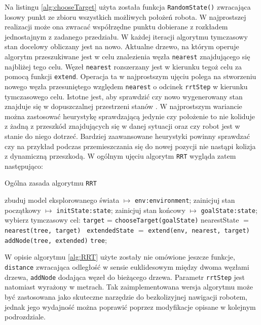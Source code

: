 Na listingu \ref{alg:chooseTarget} użyta została funkcja \texttt{RandomState()} zwracająca losowy punkt ze zbioru wszystkich możliwych położeń robota.
W najprostszej realizacji może ona zwracać współrzędne punktu dobierane z rozkładem jednostajnym z zadanego przedziału.
W każdej iteracji algorytmu tymczasowy stan docelowy obliczany jest na nowo. Aktualne drzewo, na którym operuje algorytm przeszukiwane jest w celu znalezienia
węzła \texttt{nearest} znajdującego się najbliżej tego celu. Węzeł \texttt{nearest} rozszerzany jest w kierunku tegoż celu za pomocą funkcji \texttt{extend}.
Operacja ta w najprostszym ujęciu polega na stworzeniu nowego węzła przesuniętego względem \texttt{nearest} o odcinek \texttt{rrtStep} w kierunku tymczasowego celu.
Istotne jest, aby sprawdzić czy nowo wygenerowany stan znajduje się w dopuszczalnej przestrzeni stanów \textdollar. W najprostszym wariancie można zastosować
heurystykę sprawdzającą jedynie czy położenie to nie koliduje z żadną z przeszkód znajdujących się w danej sytuacji oraz czy robot jest w stanie do niego dotrzeć.
Bardziej zaawansowane heurystyki powinny sprawdzać czy na przykład podczas przemieszczania  się do nowej pozycji nie nastąpi kolizja z dynamiczną przeszkodą.
W ogólnym ujęciu algorytm \texttt{RRT} wygląda zatem następująco:
  \begin{algorithm}[H]
	\caption{ Ogólna zasada algorytmu \texttt{RRT} }
	\label{alg:RRT}
	\begin{algorithmic}
	\STATE zbuduj model eksplorowanego świata $\mapsto$ \texttt{env:environment};
	\STATE zainicjuj stan początkowy $\mapsto$ \texttt{initState:state};
	\STATE zainicjuj stan końcowy $\mapsto$ \texttt{goalState:state};
	\STATE
	  \STATE wybierz tymczasowy cel: \texttt{target} =  \texttt{chooseTarget(goalState)}
	  \STATE nearestState $=$ \texttt{ nearest(tree, target) }
	  \STATE \texttt{extendedState} $=$ \texttt{extend(env, nearest, target)}
	    \STATE \texttt{addNode(tree, extended)}
	  \ENDIF
	\ENDWHILE
	\RETURN  \texttt{tree};
	\end{algorithmic}
  \end{algorithm}
W opisie algorytmu \ref{alg:RRT} użyte zostały nie omówione jeszcze funkcje, \texttt{distance} zwracająca odległość w sensie euklidesowym między dwoma węzłami drzewa,
\texttt{addNode} dodająca węzeł do bieżącego drzewa. Parametr \texttt{rrtStep} jest natomiast wyrażony w metrach.
Tak zaimplementowana wersja algorytmu może być zastosowana jako skuteczne narzędzie do bezkolizyjnej nawigacji robotem, jednak jego wydajność można poprawić poprzez
modyfikacje opisane w kolejnym podrozdziale.

